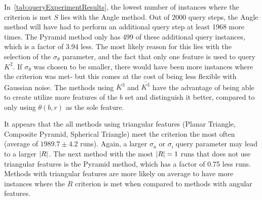 In~\autoref{tab:queryExperimentResults}, the lowest number of instances where the criterion is met $S$ lies with the
Angle method.
Out of 2000 query steps, the Angle method will have had to perform an additional query step at least 1968 more times.
The Pyramid method only has 499 of these additional query instances, which is a factor of 3.94 less.
The most likely reason for this lies with the selection of the $\sigma_\theta$ parameter, and the fact that only one
feature is used to query $K^2$.
If $\sigma_\theta$ was chosen to be smaller, there would have been more instances where the criterion was met- but
this comes at the cost of being less flexible with Gaussian noise.
The methods using $K^3$ and $\bar{K^3}$ have the advantage of being able to create utilize more features of the $b$ set and
distinguish it better, compared to only using $\theta(b, r)$ as the sole feature.

It appears that the all methods using triangular features (Planar Triangle, Composite Pyramid, Spherical Triangle)
meet the criterion the most often (average of $1989.7 \pm 4.2$ runs).
Again, a larger $\sigma_a$ or $\sigma_\imath$ query parameter may lead to a larger $\left| R \right|$.
The next method with the most $\left| R \right| = 1$ runs that does not use triangular features is the Pyramid method,
which has a factor of 0.75 less runs.
Methods with triangular features are more likely on average to have more instances where the $R$ criterion is met
when compared to methods with angular features.

